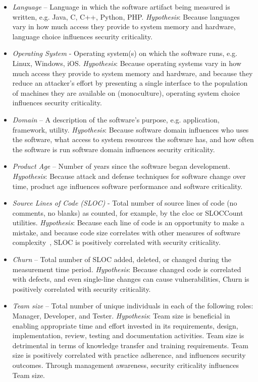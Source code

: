 \begin{itemize}
\item \textit{Language} – Language in which the software artifact being measured is written, e.g. Java, C, C++, Python, PHP. \textit{Hypothesis}: Because languages vary in how much access they provide to system memory and hardware, language choice influences security criticality.
\item \textit{Operating System} - Operating system(s) on which the software runs, e.g. Linux, Windows, iOS. \textit{Hypothesis}: Because operating systems vary in how much access they provide to system memory and hardware, and because they reduce an attacker’s effort by presenting a single interface to the population of machines they are available on (monoculture), operating system choice influences security criticality.
\item \textit{Domain} – A description of the software’s purpose, e.g. application, framework, utility. 
\textit{Hypothesis}: Because software domain influences who uses the software, what access to system resources the software has, and how often the software is run software domain influences security criticality.
\item \textit{Product Age} – Number of years since the software began development. 
\textit{Hypothesis}: Because attack and defense techniques for software change over time, product age influences software performance and software criticality.
\item \textit{Source Lines of Code (SLOC)} - Total number of source lines of code (no comments, no blanks) as counted, for example, by the cloc or SLOCCount utilities. 
\textit{Hypothesis}: Because each line of code is an opportunity to make a mistake,  and because code size correlates with other measures of software complexity~\cite{herraiz2009statistical},  SLOC is positively correlated with security criticality.
\item \textit{Churn} – Total number of SLOC added, deleted, or changed during the measurement time period. 
\textit{Hypothesis}: Because changed code is correlated with defects, and even single-line changes   can cause vulnerabilities, Churn is positively correlated with security criticality.
\item \textit{Team size} – Total number of unique individuals in each of the following roles: Manager, Developer, and Tester. \textit{Hypothesis}: Team size is beneficial in enabling appropriate time and effort invested in its requirements, design, implementation, review, testing and documentation activities. Team size is detrimental in terms of knowledge transfer and training requirements. Team size is positively correlated with practice adherence, and influences security outcomes. Through management awareness, security criticality influences Team size.

\end{itemize}
